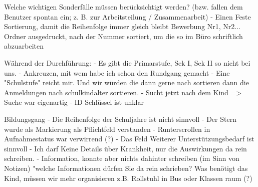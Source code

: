 Welche wichtigen Sonderfälle müssen berücksichtigt werden? (bzw. fallen dem Benutzer spontan ein; z. B. zur Arbeitsteilung / Zusammenarbeit)		
- Einen Feste Sortierung, damit die Reihenfolge immer gleich bleibt	Bewerbung Nr1, Nr2... Ordner ausgedruckt, nach der Nummer sortiert, um die so im Büro schriftlich abzuarbeiten














Während der Durchführung:									
- Es gibt die Primarstufe, Sek I, Sek II so nicht bei uns.
- Ankreuzen, mit wem habe ich schon den Rundgang gemacht
- Eine "Schulstufe" reicht mir. Und wir würden die dann gerne nach sortieren dann die Anmeldungen nach schulkindalter sortieren.
- Sucht jetzt nach dem Kind => Suche war eigenartig	
- ID Schlüssel ist unklar



















Bildungsgang
- Die Reihenfolge der Schuljahre ist nicht sinnvoll
- Der Stern wurde als Markierung als Pflichtfeld verstanden
- Runterscrollen in Aufnahmestatus war verwirrend (?)
- Das Feld Weiterer Unterstützungsbedarf ist sinnvoll
 - Ich darf Keine Details über Krankheit, nur die Auswirkungen da rein schreiben.
- Information, konnte aber nichts dahinter schreiben (im Sinn von Notizen)	"welche Informationen dürfen Sie da rein schrieben? Was benötigt das Kind, müssen wir mehr organisieren z.B. Rollstuhl in Bus oder Klassen raum (?)

















































